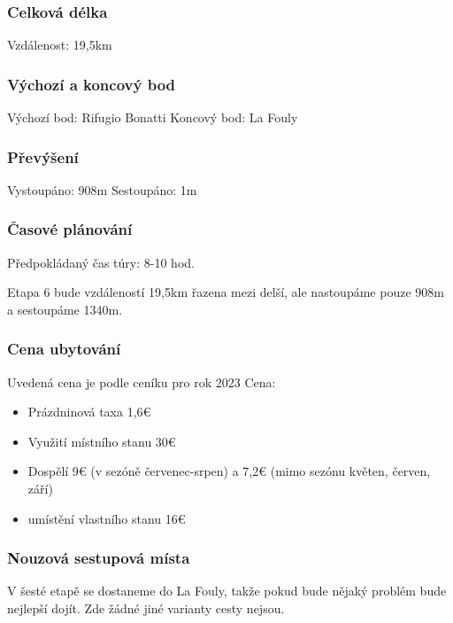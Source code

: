 \subsubsection*{Celková délka}
\noindent Vzdálenost: 19,5\:km
\subsubsection*{Výchozí a koncový bod}
\noindent Výchozí bod: Rifugio Bonatti 
\noindent Koncový bod: La Fouly
\subsubsection*{Převýšení}
\noindent Vystoupáno: 908\:m
\noindent Sestoupáno: 1\:m
\subsubsection*{Časové plánování}
\noindent Předpokládaný čas túry: 8-10 hod.

Etapa 6 bude vzdáleností 19,5\:km řazena mezi delší, ale nastoupáme pouze 908\:m a sestoupáme 1340\:m.
\subsubsection*{Cena ubytování}
\noindent Uvedená cena je podle ceníku pro rok 2023
\noindent Cena:
\begin{itemize}
	\item Prázdninová taxa 1,6\:€
	\item Využití místního stanu 30\:€
	\item Dospělí 9\:€ (v sezóně červenec-srpen) a 7,2\:€ (mimo sezónu květen, červen, září)
	\item umístění vlastního stanu 16\:€
\end{itemize}
\subsubsection*{Nouzová sestupová místa}
V šesté etapě se dostaneme do La Fouly, takže pokud bude nějaký problém bude nejlepší dojít. Zde žádné jiné varianty cesty nejsou.
